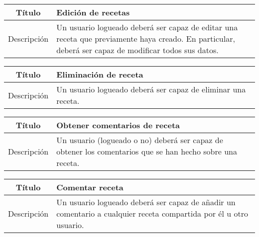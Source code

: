 \begin{center}
  
  \begin{tabularx}{\textwidth}{|c|X|}
    \hline
    Título & Edición de recetas \\

    \hline

    Descripción & Un usuario logueado deberá ser capaz de editar una receta que
    previamente haya creado. En particular, deberá ser capaz de modificar
    todos sus datos.\\

    \hline
  \end{tabularx}
\end{center}


\begin{center}
  
  \begin{tabularx}{\textwidth}{|c|X|}
    \hline
    Título & Eliminación de receta \\

    \hline

    Descripción & Un usuario logueado deberá ser capaz de eliminar una receta. \\

    \hline
  \end{tabularx}
\end{center}


\begin{center}
  
  \begin{tabularx}{\textwidth}{|c|X|}
    \hline
    Título & Obtener comentarios de receta \\

    \hline

    Descripción & Un usuario (logueado o no) deberá ser capaz de obtener los
    comentarios que se han hecho sobre una receta.\\

    \hline
  \end{tabularx}
\end{center}


\begin{center}
  
  \begin{tabularx}{\textwidth}{|c|X|}
    \hline
    Título & Comentar receta \\

    \hline

    Descripción & Un usuario logueado deberá ser capaz de añadir un comentario
    a cualquier receta compartida por él u otro usuario. \\

    \hline
  \end{tabularx}
\end{center}


